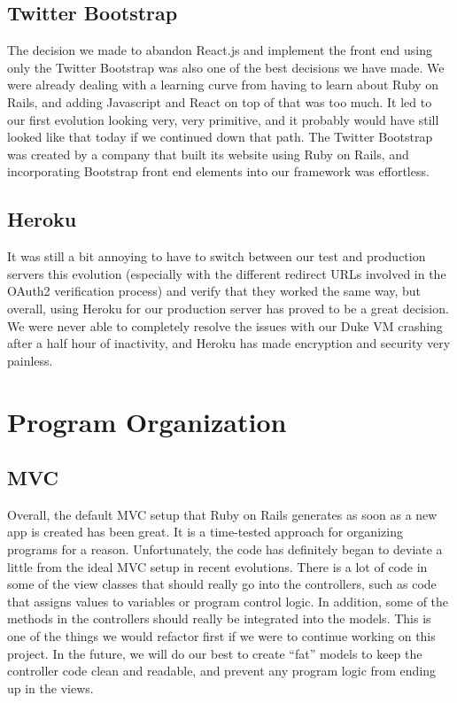 \documentclass{article}
\begin{document}
\subsection{Twitter Bootstrap}
The decision we made to abandon React.js and implement the front end using only the Twitter Bootstrap was also one of the best decisions we have made.  We were already dealing with a learning curve from having to learn about Ruby on Rails, and adding Javascript and React on top of that was too much.  It led to our first evolution looking very, very primitive, and it probably would have still looked like that today if we continued down that path.  The Twitter Bootstrap was created by a company that built its website using Ruby on Rails, and incorporating Bootstrap front end elements into our framework was effortless.
\subsection{Heroku}
It was still a bit annoying to have to switch between our test and production servers this evolution (especially with the different redirect URLs involved in the OAuth2 verification process) and verify that they worked the same way, but overall, using Heroku for our production server has proved to be a great decision.  We were never able to completely resolve the issues with our Duke VM crashing after a half hour of inactivity, and Heroku has made encryption and security very painless.
\section{Program Organization}
\subsection{MVC}
Overall, the default MVC setup that Ruby on Rails generates as soon as a new app is created has been great.  It is a time-tested approach for organizing programs for a reason.  Unfortunately, the code has definitely began to deviate a little from the ideal MVC setup in recent evolutions.  There is a lot of code in some of the view classes that should really go into the controllers, such as code that assigns values to variables or program control logic.  In addition, some of the methods in the controllers should really be integrated into the models.  This is one of the things we would refactor first if we were to continue working on this project.  In the future, we will do our best to create ``fat'' models to keep the controller code clean and readable, and prevent any program logic from ending up in the views.
\end{document}
